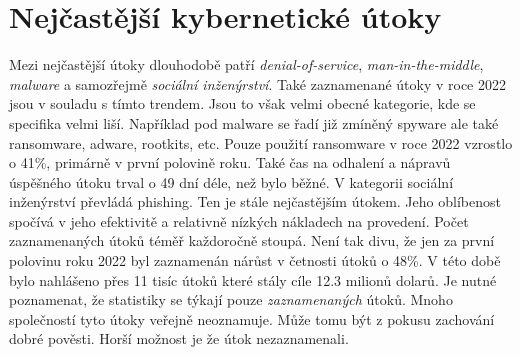 \section{Nejčastější kybernetické útoky}\label{sec:nejcastejsi-kyberneticke-utoky}
Mezi nejčastější útoky dlouhodobě patří \textit{denial-of-service}, \textit{man-in-the-middle}, \textit{malware} a samozřejmě \textit{sociální inženýrství}\cite{LI20218176}.
Také zaznamenané útoky v roce 2022 jsou v souladu s tímto trendem.
Jsou to však velmi obecné kategorie, kde se specifika velmi liší.
Například pod malware se řadí již zmíněný spyware ale také ransomware, adware, rootkits, etc.
Pouze použití ransomware v roce 2022 vzrostlo o 41\%, primárně v první polovině roku.
Také čas na odhalení a nápravů úspěšného útoku trval o 49 dní déle, než bylo běžné.
V kategorii sociální inženýrství převládá phishing.
Ten je stále nejčastějším útokem.
Jeho oblíbenost spočívá v jeho efektivitě a relativně nízkých nákladech na provedení.
Počet zaznamenaných útoků téměř každoročně stoupá\cite{moje_bakalarka}.
Není tak divu, že jen za první polovinu roku 2022 byl zaznamenán nárůst v četnosti útoků o 48\%.
V této době bylo nahlášeno přes 11 tisíc útoků které stály cíle 12.3 milionů dolarů.
Je nutné poznamenat, že statistiky se týkají pouze \textit{zaznamenaných} útoků.
Mnoho společností tyto útoky veřejně neoznamuje.
Může tomu být z pokusu zachování dobré pověsti.
Horší možnost je že útok nezaznamenali.\cite{securityintelligence_most_common_2022_attacks}

